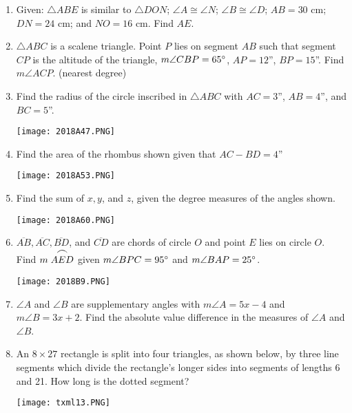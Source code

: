 \documentclass[../uilmath.tex]{subfiles}
\begin{document}
\begin{enumerate}[label=\bfseries\arabic*.]
    \item %
    Given: $\triangle ABE$ is similar to $\triangle DON$; $\angle A \cong \angle N$; $\angle B\cong \angle D$; $AB=30$ cm; $DN=24$ cm; and $NO=16$ cm. Find $AE$.

    \item %
    $\triangle ABC$ is a scalene triangle. Point $P$ lies on segment $AB$ such that segment $CP$ is the altitude of the triangle, $m\angle CBP=65\degree$, $AP=12$'', $BP=15$''. Find $m\angle ACP$. (nearest degree)

    \item %
    Find the radius of the circle inscribed in $\triangle ABC$ with $AC=3$'', $AB=4$'', and $BC=5$''.
    \begin{center}
        \texttt{[image: 2018A47.PNG]}
    \end{center}

    \item %
    Find the area of the rhombus shown given that $AC-BD=4$''
    \begin{center}
        \texttt{[image: 2018A53.PNG]}
    \end{center}

    \item %
    Find the sum of $x,y$, and $z$, given the degree measures of the angles shown.
    \begin{center}
        \texttt{[image: 2018A60.PNG]}
    \end{center}

    \item %
    $\overline{AB}, \overline{AC}, \overline{BD}$, and $\overline{CD}$ are chords of circle $O$ and point $E$ lies on circle $O$. Find $m\stackrel{\mbox{\large$\frown$}}{AED}$ given $m\angle BPC = 95\degree$ and $m\angle BAP = 25\degree$.
    \begin{center}
        \texttt{[image: 2018B9.PNG]}
    \end{center}

    \item %
    $\angle A$ and $\angle B$ are supplementary angles with $m\angle A = 5x-4$ and $m\angle B = 3x+2$. Find the 
    absolute value difference in the measures of $\angle A$ and $\angle B$.

    \item %
    An $8\times 27$ rectangle is split into four triangles, as shown below, by three line segments which divide the rectangle's longer sides into segments of lengths 6 and 21. How long is the dotted segment?
    \begin{center}
        \texttt{[image: txml13.PNG]}
    \end{center}


\end{enumerate}
\end{document}
